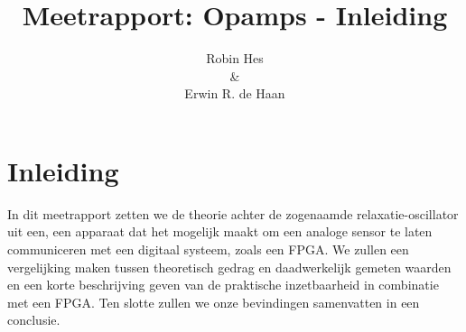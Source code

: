 \documentclass{report}
\title{Meetrapport: Opamps - Inleiding}
\author{Robin Hes\\\&\\Erwin R. de Haan}
\begin{document}
\chapter{Inleiding}
In dit meetrapport zetten we de theorie achter de zogenaamde relaxatie-oscillator uit een, een apparaat dat het mogelijk maakt om een analoge sensor te laten communiceren met een digitaal systeem, zoals een FPGA. We zullen een vergelijking maken tussen theoretisch gedrag en daadwerkelijk gemeten waarden en een korte beschrijving geven van de praktische inzetbaarheid in combinatie met een FPGA. Ten slotte zullen we onze bevindingen samenvatten in een conclusie.
\end{document}
